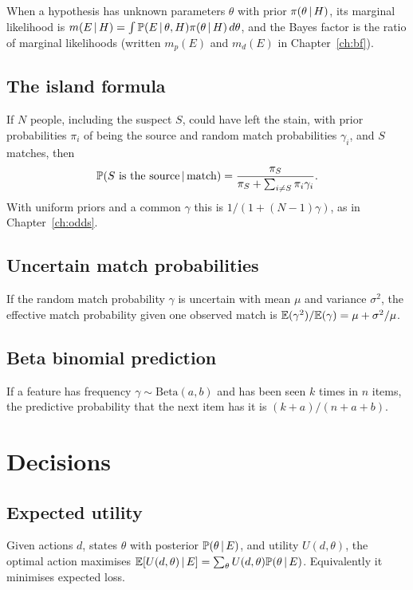 When a hypothesis has unknown parameters $\theta$ with prior $\pi(\theta\,\vert\, H)$, its marginal likelihood is $m(E\,\vert\, H) = \int \mathbb{P}(E\,\vert\,\theta,H)\pi(\theta\,\vert\, H)\,d\theta$, and the Bayes factor is the ratio of marginal likelihoods (written $m_p(E)$ and $m_d(E)$ in Chapter~\ref{ch:bf}).

\subsection{The island formula}

If $N$ people, including the suspect $S$, could have left the stain, with prior probabilities $\pi_i$ of being the source and random match probabilities $\gamma_i$, and $S$ matches, then
\[
\mathbb{P}(S \text{ is the source}\,\vert\,\text{match}) = \frac{\pi_S}{\pi_S + \sum_{i\ne S}\pi_i \gamma_i}.
\]
With uniform priors and a common $\gamma$ this is $1/(1 + (N-1)\gamma)$, as in Chapter~\ref{ch:odds}.

\subsection{Uncertain match probabilities}

If the random match probability $\gamma$ is uncertain with mean $\mu$ and variance $\sigma^2$, the effective match probability given one observed match is $\mathbb{E}(\gamma^2)/\mathbb{E}(\gamma) = \mu + \sigma^2/\mu$.

\subsection{Beta binomial prediction}

If a feature has frequency $\gamma \sim \text{Beta}(a,b)$ and has been seen $k$ times in $n$ items, the predictive probability that the next item has it is $(k+a)/(n+a+b)$.

\section{Decisions}

\subsection{Expected utility}

Given actions $d$, states $\theta$ with posterior $\mathbb{P}(\theta\,\vert\, E)$, and utility $U(d,\theta)$, the optimal action maximises $\mathbb{E}[U(d,\theta)\,\vert\, E] = \sum_\theta U(d,\theta)\mathbb{P}(\theta\,\vert\, E)$. Equivalently it minimises expected loss.

